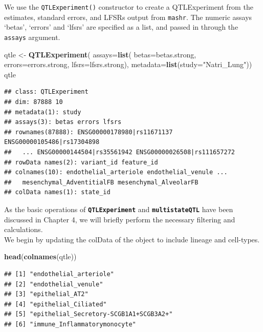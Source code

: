 \documentclass[
]{article}
\newenvironment{Shaded}{\begin{snugshade}}{\end{snugshade}}
\newcommand{\AttributeTok}[1]{\textcolor[rgb]{0.13,0.29,0.53}{#1}}
\newcommand{\FunctionTok}[1]{\textcolor[rgb]{0.13,0.29,0.53}{\textbf{#1}}}
\newcommand{\NormalTok}[1]{#1}
\newcommand{\OtherTok}[1]{\textcolor[rgb]{0.56,0.35,0.01}{#1}}
\newcommand{\StringTok}[1]{\textcolor[rgb]{0.31,0.60,0.02}{#1}}
\begin{document}
We use the \texttt{QTLExperiment()} constructor to create a
QTLExperiment from the estimates, standard errors, and LFSRs output from
\texttt{mashr}. The numeric assays `betas', `errors' and `lfsrs' are
specified as a list, and passed in through the \texttt{assays} argument.
\footnotesize

\begin{Shaded}
\begin{Highlighting}[]
\NormalTok{qtle }\OtherTok{\textless{}{-}} \FunctionTok{QTLExperiment}\NormalTok{(}
    \AttributeTok{assays=}\FunctionTok{list}\NormalTok{(}
        \AttributeTok{betas=}\NormalTok{betas.strong,}
        \AttributeTok{errors=}\NormalTok{errors.strong,}
        \AttributeTok{lfsrs=}\NormalTok{lfsrs.strong),}
    \AttributeTok{metadata=}\FunctionTok{list}\NormalTok{(}\AttributeTok{study=}\StringTok{"Natri\_Lung"}\NormalTok{))}
\NormalTok{qtle}
\end{Highlighting}
\end{Shaded}

\begin{verbatim}
## class: QTLExperiment 
## dim: 87888 10 
## metadata(1): study
## assays(3): betas errors lfsrs
## rownames(87888): ENSG00000178980|rs11671137 ENSG00000105486|rs17304898
##   ... ENSG00000144504|rs35561942 ENSG00000026508|rs111657272
## rowData names(2): variant_id feature_id
## colnames(10): endothelial_arteriole endothelial_venule ...
##   mesenchymal_AdventitialFB mesenchymal_AlveolarFB
## colData names(1): state_id
\end{verbatim}

\normalsize

As the basic operations of \textbf{\texttt{QTLExperiment}} and
\textbf{\texttt{multistateQTL}} have been discussed in Chapter 4, we
will briefly perform the necessary filtering and calculations.\\
We begin by updating the colData of the object to include lineage and
cell-types. \footnotesize

\begin{Shaded}
\begin{Highlighting}[]
\FunctionTok{head}\NormalTok{(}\FunctionTok{colnames}\NormalTok{(qtle))}
\end{Highlighting}
\end{Shaded}

\begin{verbatim}
## [1] "endothelial_arteriole"                
## [2] "endothelial_venule"                   
## [3] "epithelial_AT2"                       
## [4] "epithelial_Ciliated"                  
## [5] "epithelial_Secretory-SCGB1A1+SCGB3A2+"
## [6] "immune_Inflammatorymonocyte"
\end{verbatim}
\end{document}
